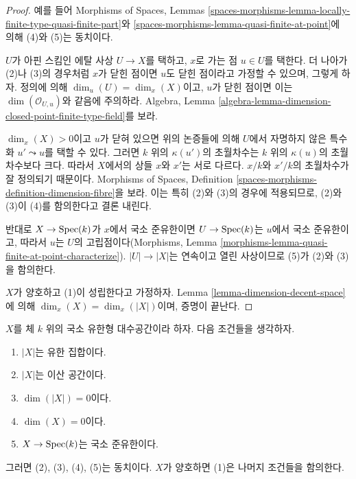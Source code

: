 \begin{proof}
예를 들어 Morphisms of Spaces, Lemmas
\ref{spaces-morphisms-lemma-locally-finite-type-quasi-finite-part}와
\ref{spaces-morphisms-lemma-quasi-finite-at-point}에 의해 (4)와 (5)는
동치이다.

\medskip\noindent
$U$가 아핀 스킴인 에탈 사상 $U \to X$를 택하고, $x$로 가는 점
$u \in U$를 택한다. 더 나아가 (2)나 (3)의 경우처럼 $x$가 닫힌
점이면 $u$도 닫힌 점이라고 가정할 수 있으며, 그렇게 하자.
정의에 의해 $\dim_u(U) = \dim_x(X)$이고, $u$가 닫힌 점이면 이는
$\dim(\mathcal{O}_{U, u})$와 같음에 주의하라. Algebra, Lemma
\ref{algebra-lemma-dimension-closed-point-finite-type-field}를 보라.

\medskip\noindent
$\dim_x(X) > 0$이고 $u$가 닫혀 있으면 위의 논증들에 의해 $U$에서
자명하지 않은 특수화 $u' \leadsto u$를 택할 수 있다. 그러면 $k$ 위의
$\kappa(u')$의 초월차수는 $k$ 위의 $\kappa(u)$의 초월차수보다 크다.
따라서 $X$에서의 상들 $x$와 $x'$는 서로 다르다. $x/k$와 $x'/k$의
초월차수가 잘 정의되기 때문이다. Morphisms of Spaces, Definition
\ref{spaces-morphisms-definition-dimension-fibre}을 보라.
이는 특히 (2)와 (3)의 경우에 적용되므로, (2)와 (3)이 (4)를 함의한다고
결론 내린다.

\medskip\noindent
반대로 $X \to \mathop{\mathrm{Spec}}(k)$가 $x$에서 국소 준유한이면
$U \to \mathop{\mathrm{Spec}}(k)$는 $u$에서 국소 준유한이고, 따라서 $u$는 $U$의
고립점이다(Morphisms, Lemma
\ref{morphisms-lemma-quasi-finite-at-point-characterize}).
$|U| \to |X|$는 연속이고 열린 사상이므로 (5)가 (2)와 (3)을
함의한다.

\medskip\noindent
$X$가 양호하고 (1)이 성립한다고 가정하자. Lemma
\ref{lemma-dimension-decent-space}에 의해
$\dim_x(X) = \dim_x(|X|)$이며, 증명이 끝난다.
\end{proof}

\begin{lemma}
\label{lemma-conditions-on-space-over-field}
$X$를 체 $k$ 위의 국소 유한형 대수공간이라 하자.
다음 조건들을 생각하자.
\begin{enumerate}
\item $|X|$는 유한 집합이다.
\item $|X|$는 이산 공간이다.
\item $\dim(|X|) = 0$이다.
\item $\dim(X) = 0$이다.
\item $X \to \mathop{\mathrm{Spec}}(k)$는 국소 준유한이다.
\end{enumerate}
그러면 (2), (3), (4), (5)는 동치이다.
$X$가 양호하면 (1)은 나머지 조건들을 함의한다.
\end{lemma}

